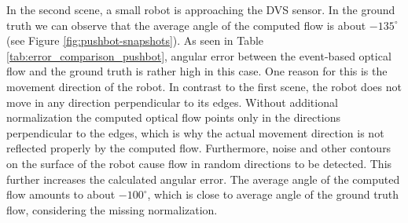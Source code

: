 In the second scene, a small robot is approaching the DVS sensor.
In the ground truth we can observe that the average angle of the computed flow is about $-135^\circ$ (see Figure \ref{fig:pushbot-snapshots}). 
As seen in Table \ref{tab:error_comparison_pushbot}, angular error between the event-based optical flow and the ground truth is rather high in this case.
One reason for this is the movement direction of the robot.
In contrast to the first scene, the robot does not move in any direction perpendicular to its edges.
Without additional normalization the computed optical flow points only in the directions perpendicular to the edges, which is why the actual movement direction is not reflected properly by the computed flow.
Furthermore, noise and other contours on the surface of the robot cause flow in random directions to be detected.
This further increases the calculated angular error.
The average angle of the computed flow amounts to about $-100^\circ$, which is close to average angle of the ground truth flow, considering the missing normalization.


